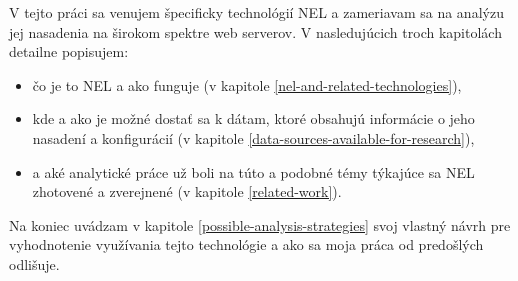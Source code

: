 V tejto práci sa venujem špecificky technológií NEL a zameriavam sa na analýzu jej nasadenia na širokom spektre web serverov. 
V nasledujúcich troch kapitolách detailne popisujem:
\begin{itemize}
    \item čo je to NEL a ako funguje (v kapitole \ref{nel-and-related-technologies}),
    \item kde a ako je možné dostať sa k dátam, ktoré obsahujú informácie o jeho nasadení a 
konfigurácií (v kapitole \ref{data-sources-available-for-research}),
    \item a aké analytické práce už boli na túto a podobné témy
týkajúce sa NEL zhotovené a zverejnené (v kapitole \ref{related-work}).
\end{itemize}

Na koniec uvádzam v kapitole 
\ref{possible-analysis-strategies} svoj vlastný návrh pre vyhodnotenie využívania tejto technológie a ako sa moja práca od predošlých odlišuje. 

